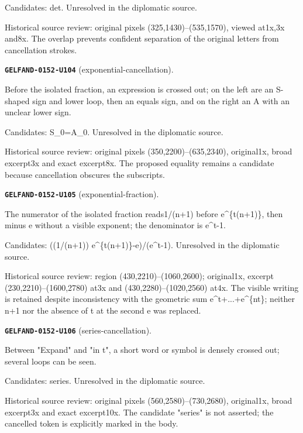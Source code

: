 Candidates: det. Unresolved in the diplomatic source.\par
Historical source review: original pixels (325,1430)–(535,1570), viewed at1x,3x and8x. The overlap prevents confident separation of the original letters from cancellation strokes.\par\medskip
\par\noindent\leavevmode{}\label{GELFAND-0152-U104}\textbf{\texttt{GELFAND-0152-U104}} (exponential-cancellation).\nopagebreak[4]\par
Before the isolated fraction, an expression is crossed out; on the left are an S-shaped sign and lower loop, then an equals sign, and on the right an A with an unclear lower sign.\par
Candidates: S\_0=A\_0. Unresolved in the diplomatic source.\par
Historical source review: original pixels (350,2200)–(635,2340), original1x, broad excerpt3x and exact excerpt8x. The proposed equality remains a candidate because cancellation obscures the subscripts.\par\medskip
\par\noindent\leavevmode{}\label{GELFAND-0152-U105}\textbf{\texttt{GELFAND-0152-U105}} (exponential-fraction).\nopagebreak[4]\par
The numerator of the isolated fraction reads1/(n+1) before e\textasciicircum{}\{t(n+1)\}, then minus e without a visible exponent; the denominator is e\textasciicircum{}t-1.\par
Candidates: ((1/(n+1)) e\textasciicircum{}\{t(n+1)\}-e)/(e\textasciicircum{}t-1). Unresolved in the diplomatic source.\par
Historical source review: region (430,2210)–(1060,2600); original1x, excerpt (230,2210)–(1600,2780) at3x and (430,2280)–(1020,2560) at4x. The visible writing is retained despite inconsistency with the geometric sum e\textasciicircum{}t+...+e\textasciicircum{}\{nt\}; neither n+1 nor the absence of t at the second e was replaced.\par\medskip
\par\noindent\leavevmode{}\label{GELFAND-0152-U106}\textbf{\texttt{GELFAND-0152-U106}} (series-cancellation).\nopagebreak[4]\par
Between "Expand" and "in t", a short word or symbol is densely crossed out; several loops can be seen.\par
Candidates: series. Unresolved in the diplomatic source.\par
Historical source review: original pixels (560,2580)–(730,2680), original1x, broad excerpt3x and exact excerpt10x. The candidate "series" is not asserted; the cancelled token is explicitly marked in the body.\par\medskip

